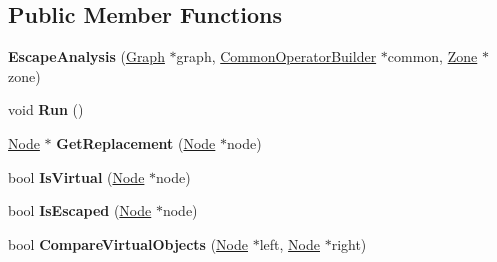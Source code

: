 \subsection*{Public Member Functions}
\begin{DoxyCompactItemize}
\item 
{\bfseries Escape\+Analysis} (\hyperlink{classv8_1_1internal_1_1compiler_1_1_graph}{Graph} $\ast$graph, \hyperlink{classv8_1_1internal_1_1compiler_1_1_common_operator_builder}{Common\+Operator\+Builder} $\ast$common, \hyperlink{classv8_1_1internal_1_1_zone}{Zone} $\ast$zone)\hypertarget{classv8_1_1internal_1_1compiler_1_1_escape_analysis_a7436144aea89cf36a4257efc3091b416}{}\label{classv8_1_1internal_1_1compiler_1_1_escape_analysis_a7436144aea89cf36a4257efc3091b416}

\item 
void {\bfseries Run} ()\hypertarget{classv8_1_1internal_1_1compiler_1_1_escape_analysis_a2e0118c6e539ab1931d7c979dccfe115}{}\label{classv8_1_1internal_1_1compiler_1_1_escape_analysis_a2e0118c6e539ab1931d7c979dccfe115}

\item 
\hyperlink{classv8_1_1internal_1_1compiler_1_1_node}{Node} $\ast$ {\bfseries Get\+Replacement} (\hyperlink{classv8_1_1internal_1_1compiler_1_1_node}{Node} $\ast$node)\hypertarget{classv8_1_1internal_1_1compiler_1_1_escape_analysis_ac21c2ad9b9bfd1cc8d4ccd93884491ec}{}\label{classv8_1_1internal_1_1compiler_1_1_escape_analysis_ac21c2ad9b9bfd1cc8d4ccd93884491ec}

\item 
bool {\bfseries Is\+Virtual} (\hyperlink{classv8_1_1internal_1_1compiler_1_1_node}{Node} $\ast$node)\hypertarget{classv8_1_1internal_1_1compiler_1_1_escape_analysis_ad249f0a74949f4555f01fb657e828495}{}\label{classv8_1_1internal_1_1compiler_1_1_escape_analysis_ad249f0a74949f4555f01fb657e828495}

\item 
bool {\bfseries Is\+Escaped} (\hyperlink{classv8_1_1internal_1_1compiler_1_1_node}{Node} $\ast$node)\hypertarget{classv8_1_1internal_1_1compiler_1_1_escape_analysis_ae046610e731822294a3a23c950def382}{}\label{classv8_1_1internal_1_1compiler_1_1_escape_analysis_ae046610e731822294a3a23c950def382}

\item 
bool {\bfseries Compare\+Virtual\+Objects} (\hyperlink{classv8_1_1internal_1_1compiler_1_1_node}{Node} $\ast$left, \hyperlink{classv8_1_1internal_1_1compiler_1_1_node}{Node} $\ast$right)\hypertarget{classv8_1_1internal_1_1compiler_1_1_escape_analysis_ad455cda08e0a3907be1c55a702a16b81}{}\label{classv8_1_1internal_1_1compiler_1_1_escape_analysis_ad455cda08e0a3907be1c55a702a16b81}


\end{DoxyCompactItemize}
